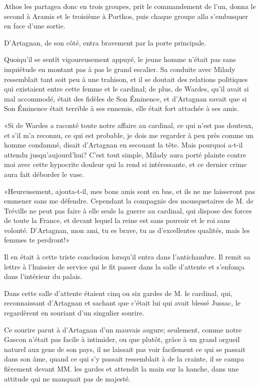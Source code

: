 Athos les partagea donc en trois groupes, prit le commandement de l'un, donna le second à Aramis et le troisième à Porthos, puis chaque groupe alla s'embusquer en face d'une sortie. 

D'Artagnan, de son côté, entra bravement par la porte principale. 

Quoiqu'il se sentît vigoureusement appuyé, le jeune homme n'était pas sans inquiétude en montant pas à pas le grand escalier. Sa conduite avec Milady ressemblait tant soit peu à une trahison, et il se doutait des relations politiques qui existaient entre cette femme et le cardinal; de plus, de Wardes, qu'il avait si mal accommodé, était des fidèles de Son Éminence, et d'Artagnan savait que si Son Éminence était terrible à ses ennemis, elle était fort attachée à ses amis. 

«Si de Wardes a raconté toute notre affaire au cardinal, ce qui n'est pas douteux, et s'il m'a reconnu, ce qui est probable, je dois me regarder à peu près comme un homme condamné, disait d'Artagnan en secouant la tête. Mais pourquoi a-t-il attendu jusqu'aujourd'hui? C'est tout simple, Milady aura porté plainte contre moi avec cette hypocrite douleur qui la rend si intéressante, et ce dernier crime aura fait déborder le vase. 

«Heureusement, ajouta-t-il, mes bons amis sont en bas, et ils ne me laisseront pas emmener sans me défendre. Cependant la compagnie des mousquetaires de M. de Tréville ne peut pas faire à elle seule la guerre au cardinal, qui dispose des forces de toute la France, et devant lequel la reine est sans pouvoir et le roi sans volonté. D'Artagnan, mon ami, tu es brave, tu as d'excellentes qualités, mais les femmes te perdront!» 

Il en était à cette triste conclusion lorsqu'il entra dans l'antichambre. Il remit sa lettre à l'huissier de service qui le fit passer dans la salle d'attente et s'enfonça dans l'intérieur du palais. 

Dans cette salle d'attente étaient cinq ou six gardes de M. le cardinal, qui, reconnaissant d'Artagnan et sachant que c'était lui qui avait blessé Jussac, le regardèrent en souriant d'un singulier sourire. 

Ce sourire parut à d'Artagnan d'un mauvais augure; seulement, comme notre Gascon n'était pas facile à intimider, ou que plutôt, grâce à un grand orgueil naturel aux gens de son pays, il ne laissait pas voir facilement ce qui se passait dans son âme, quand ce qui s'y passait ressemblait à de la crainte, il se campa fièrement devant MM. les gardes et attendit la main sur la hanche, dans une attitude qui ne manquait pas de majesté. 

